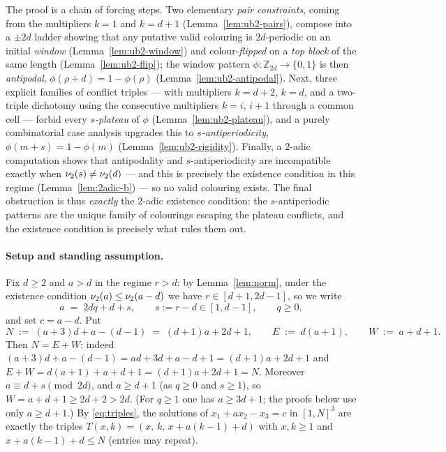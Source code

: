 
The proof is a chain of forcing steps. Two elementary \emph{pair
constraints}, coming from the multipliers $k = 1$ and $k = d+1$
(Lemma~\ref{lem:ub2-pairs}), compose into a $\pm 2d$ ladder showing that any
putative valid colouring is $2d$-periodic on an initial \emph{window}
(Lemma~\ref{lem:ub2-window}) and colour-\emph{flipped} on a \emph{top block}
of the same length (Lemma~\ref{lem:ub2-flip}); the window pattern
$\phi \colon \mathbb{Z}_{2d} \to \{0,1\}$ is then \emph{antipodal},
$\phi(\rho + d) = 1 - \phi(\rho)$ (Lemma~\ref{lem:ub2-antipodal}). Next,
three explicit families of conflict triples --- with multipliers $k = d+2$,
$k = d$, and a two-triple dichotomy using the consecutive multipliers
$k = i,\, i+1$ through a common cell --- forbid every \emph{$s$-plateau} of
$\phi$ (Lemma~\ref{lem:ub2-plateau}), and a purely combinatorial case
analysis upgrades this to \emph{$s$-antiperiodicity},
$\phi(m + s) = 1 - \phi(m)$ (Lemma~\ref{lem:ub2-rigidity}). Finally, a
$2$-adic computation shows that antipodality and $s$-antiperiodicity are
incompatible exactly when $\nu_2(s) \ne \nu_2(d)$ --- and this is precisely
the existence condition in this regime (Lemma~\ref{lem:2adic-b}) --- so no
valid colouring exists. The final obstruction is thus \emph{exactly} the
$2$-adic existence condition: the $s$-antiperiodic patterns are the unique
family of colourings escaping the plateau conflicts, and the existence
condition is precisely what rules them out.

\paragraph{Setup and standing assumption.}
Fix $d \ge 2$ and $a > d$ in the regime $r > d$: by Lemma~\ref{lem:norm},
under the existence condition $\nu_2(a) \le \nu_2(a-d)$ we have
$r \in [d+1, 2d-1]$, so we write
\[
a \;=\; 2dq + d + s, \qquad s := r - d \in [1, d-1], \qquad q \ge 0,
\]
and set $c = a - d$. Put
\[
N \;:=\; (a+3)d + a - (d-1) \;=\; (d+1)a + 2d + 1,
\qquad
E \;:=\; d(a+1),
\qquad
W \;:=\; a + d + 1 .
\]
Then $N = E + W$: indeed
$(a+3)d + a - (d-1) = ad + 3d + a - d + 1 = (d+1)a + 2d + 1$ and
$E + W = d(a+1) + a + d + 1 = (d+1)a + 2d + 1 = N$. Moreover
$a \equiv d + s \pmod{2d}$, and $a \ge d + 1$ (as $q \ge 0$ and $s \ge 1$),
so $W = a + d + 1 \ge 2d + 2 > 2d$. (For $q \ge 1$ one has $a \ge 3d + 1$;
the proofs below use only $a \ge d + 1$.) By \eqref{eq:triples}, the
solutions of $x_1 + a x_2 - x_3 = c$ in $[1,N]^3$ are exactly the triples
$T(x,k) = (x,\, k,\, x + a(k-1) + d)$ with $x, k \ge 1$ and
$x + a(k-1) + d \le N$ (entries may repeat).

